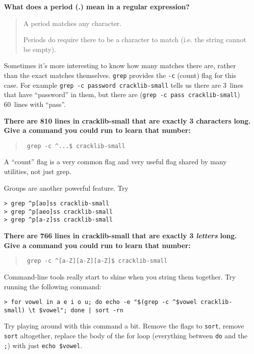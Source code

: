 \documentclass{article}
\begin{document}
\noindent
\textbf{What does a period (.) mean in a regular expression?}
\begin{quote}
  \color{violet}
  A period matches any character.

  Periods do require there to be a character to match (i.e. the string cannot
  be empty).
\end{quote}

\noindent
Sometimes it's more interesting to know how many matches there are, rather
than the exact matches themselves. \texttt{grep} provides the \texttt{-c}
(count) flag for this case. For example
\texttt{grep~-c~password~cracklib-small} tells us there are 3~lines that have
``password'' in them, but there are (\texttt{grep~-c~pass~cracklib-small})
60~lines with ``pass''.

\medskip
\noindent
\textbf{There are 810 lines in cracklib-small that are exactly 3 characters
long. Give a command you could run to learn that number:}
\begin{quote}\tt
  \color{violet}
  grep -c \^{}...\$ cracklib-small
\end{quote}


\noindent
A ``count'' flag is a very common flag and very useful flag shared by many
utilities, not just grep.

\bigskip
\bigskip
\noindent
Groups are another powerful feature. Try
\begin{lstlisting}
> grep ^p[ao]ss cracklib-small
> grep ^p[aeo]ss cracklib-small
> grep ^p[a-z]ss cracklib-small
\end{lstlisting}

\medskip
\noindent
\textbf{There are 766 lines in cracklib-small that are exactly 3
\emph{letters} long. Give a command you could run to learn that number:}
\begin{quote}\tt
  \color{violet}
  grep -c \^{}[a-Z][a-Z][a-Z]\$ cracklib-small
\end{quote}


\medskip
\noindent
Command-line tools really start to shine when you string them together.
Try running the following command:
\begin{lstlisting}
> for vowel in a e i o u; do echo -e "$(grep -c ^$vowel cracklib-small) \t $vowel"; done | sort -rn
\end{lstlisting}
Try playing around with this command a bit. Remove the flags to \texttt{sort},
remove \texttt{sort} altogether, replace the body of the for loop (everything
between \texttt{do} and the \texttt{;}) with just \texttt{echo \$vowel}.
\end{document}
